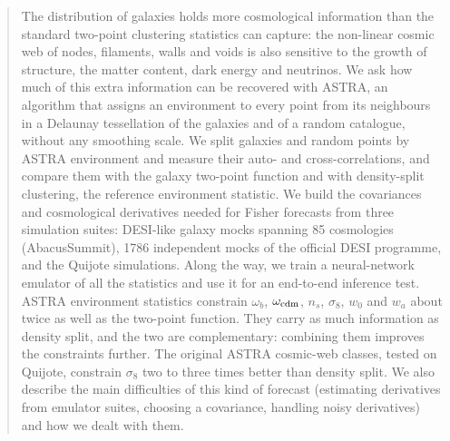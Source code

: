 \begin{abstract}
The distribution of galaxies holds more cosmological information than the standard two-point clustering statistics can capture: the non-linear cosmic web of nodes, filaments, walls and voids is also sensitive to the growth of structure, the matter content, dark energy and neutrinos. We ask how much of this extra information can be recovered with ASTRA, an algorithm that assigns an environment to every point from its neighbours in a Delaunay tessellation of the galaxies and of a random catalogue, without any smoothing scale. We split galaxies and random points by ASTRA environment and measure their auto- and cross-correlations, and compare them with the galaxy two-point function and with density-split clustering, the reference environment statistic. We build the covariances and cosmological derivatives needed for Fisher forecasts from three simulation suites: DESI-like galaxy mocks spanning 85 cosmologies (AbacusSummit), 1786 independent mocks of the official DESI programme, and the Quijote simulations. Along the way, we train a neural-network emulator of all the statistics and use it for an end-to-end inference test. ASTRA environment statistics constrain $\omega_b$, $\omega_{\rm cdm}$, $n_s$, $\sigma_8$, $w_0$ and $w_a$ about twice as well as the two-point function. They carry as much information as density split, and the two are complementary: combining them improves the constraints further. The original ASTRA cosmic-web classes, tested on Quijote, constrain $\sigma_8$ two to three times better than density split. We also describe the main difficulties of this kind of forecast (estimating derivatives from emulator suites, choosing a covariance, handling noisy derivatives) and how we dealt with them.
\end{abstract}
